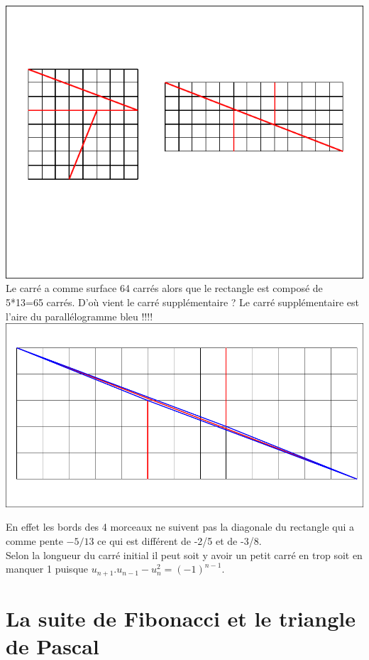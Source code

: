 \documentclass[a4paper,11pt]{book}
\begin{document}
\includegraphics[width=\textwidth]{fibona}
Le carr\'e a comme surface 64 carr\'es alors que le rectangle est compos\'e de 
5*13=65 carr\'es. D'o\`u vient le carr\'e suppl\'ementaire ?
Le carr\'e suppl\'ementaire est l'aire du parall\'elogramme bleu !!!!\\

\includegraphics[width=\textwidth]{fibonac}

En effet les bords des 4 morceaux ne suivent pas la diagonale du rectangle qui
a comme pente $-5/13$ ce qui est diff\'erent de -2/5 et de -3/8.\\
Selon la longueur du carr\'e initial il peut soit y avoir un petit carr\'e en 
trop soit en manquer 1 puisque $u_{n+1}.u_{n-1}-u_n^2=(-1)^{n-1}$.


\section{La suite de Fibonacci et le triangle de Pascal}
\end{document}
